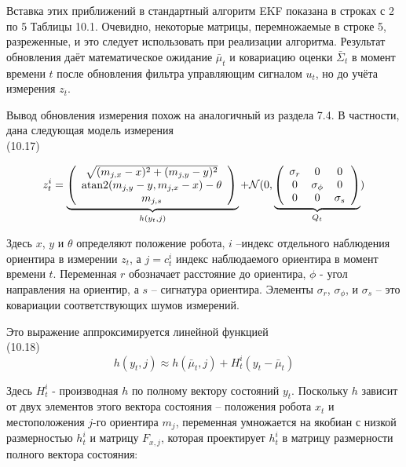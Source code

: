 \documentclass[10pt,a4paper]{article}
\begin{document}
Вставка этих приближений в стандартный алгоритм EKF показана в строках с 2 по 5 Таблицы 10.1. Очевидно, некоторые матрицы, перемножаемые в строке 5, разреженные, и это следует использовать при реализации алгоритма.  Результат обновления даёт математическое ожидание $\bar{\mu}_t$ и ковариацию оценки $\bar{\varSigma}_t$  в момент времени $t$ после обновления фильтра управляющим сигналом $u_t$, но до учёта измерения $z_t$.

Вывод обновления измерения похож на аналогичный из раздела 7.4. В частности, дана следующая модель измерения\\

(10.17)
\begin{minipage}{0.2\textwidth}
\begin{equation*}
z_t^i=\underbrace {\left(\begin{array}{c} 
\sqrt{(m_{j,x}-x)^2+(m_{j,y}-y)^2}\\
\text{atan2}(m_{j,y}-y,m_{j,x}-x)-\theta\\	m_{j,s}\\
\end{array} \right)\\}_{h(y_t,j)}+\mathcal{N}(0,\underbrace{\left(\begin{array}{ccc} \sigma_r&0&0\\
0&\sigma_\phi&0\\
0&0&\sigma_s\\
\end{array} \right)}_{Q_t})
\end{equation*}
\end{minipage}

Здесь $x$, $y$ и $\theta$ определяют положение робота, $i$ –индекс отдельного наблюдения ориентира в измерении $z_t$, а $j=c_t^i$ индекс наблюдаемого ориентира в момент времени $t$. Переменная $r$ обозначает расстояние до ориентира, $\phi$ -  угол направления на ориентир, а $s$ – сигнатура ориентира. Элементы $\sigma_r$, $\sigma_\phi$, и $\sigma_s$ – это ковариации соответствующих шумов измерений.

Это выражение аппроксимируется линейной функцией\\

(10.18)
$$h(y_t,j)\approx h(\bar{\mu}_t,j)+H_t^i(y_t-\bar{\mu}_t)$$

Здесь $H_t^i$ - производная $h$ по полному вектору состояний $y_t$. Поскольку $h$ зависит от двух элементов этого вектора состояния – положения робота $x_t$ и местоположения $j$-го ориентира $m_j$, переменная умножается на якобиан с низкой размерностью $h_t^i$ и матрицу $F_{x,j}$, которая проектирует $h_t^i$ в матрицу размерности полного вектора состояния:\\
\end{document}
